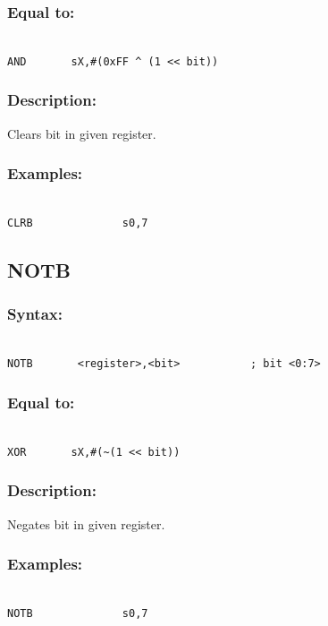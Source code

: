         \subsubsection{Equal to:}
        {
            ~\\
            \usecodefont
            \verb'AND       sX,#(0xFF ^ (1 << bit))'
        }
        \subsubsection{Description:}
            Clears bit in given register.

        \subsubsection{Examples:}
        {
            ~\\
            \usecodefont
            \verb'CLRB              s0,7'\\
        }

    \subsection{NOTB}
        \subsubsection{Syntax:}
        {
            ~\\
            \usecodefont
            \verb'NOTB       <register>,<bit>           ; bit <0:7>'
        }
        \subsubsection{Equal to:}
        {
            ~\\
            \usecodefont
            \verb'XOR       sX,#(~(1 << bit))'
        }
        \subsubsection{Description:}
            Negates bit in given register.

        \subsubsection{Examples:}
        {
            ~\\
            \usecodefont
            \verb'NOTB              s0,7'\\
        }

